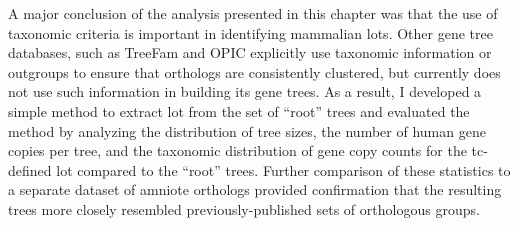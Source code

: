 A major conclusion of the analysis presented in this chapter was that
the use of taxonomic criteria is important in identifying mammalian
\acp{lot}. Other gene tree databases, such as TreeFam
\citep{Ruan2008} and OPIC \citep{Heger2008} explicitly use taxonomic
information or outgroups to ensure that orthologs are consistently
clustered, but \cmp currently does not use such information in
building its gene trees. As a result, I developed a simple method to
extract \ac{lot} from the set of ``root'' \cmp trees and evaluated the
method by analyzing the distribution of tree sizes, the number of
human gene copies per tree, and the taxonomic distribution of gene
copy counts for the \ac{tc}-defined \ac{lot} compared to the ``root''
\cmp trees. Further comparison of these statistics to a separate
dataset of amniote orthologs provided confirmation that the resulting
trees more closely resembled previously-published sets of orthologous
groups.

